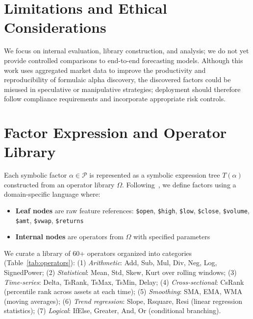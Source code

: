 \documentclass[sigconf]{acmart}
\begin{document}
\section{Limitations and Ethical Considerations}
We focus on internal evaluation, library construction, and analysis; we do not yet provide controlled comparisons to end-to-end forecasting models. Although this work uses aggregated market data to improve the productivity and reproducibility of formulaic alpha discovery, the discovered factors could be misused in speculative or manipulative strategies; deployment should therefore follow compliance requirements and incorporate appropriate risk controls.




\newpage
\appendix
\onecolumn

\section{Factor Expression and Operator Library}
\label{app:factor-details}

Each symbolic factor $\alpha \in \mathcal{P}$ is represented as a symbolic expression tree $T(\alpha)$ constructed from an operator library $\Omega$.
Following~\citet{kakushadze2016alphas}, we define factors using a domain-specific language where:
{\setlength{\leftmargini}{1.4em}%
\begin{itemize}
  \item \textbf{Leaf nodes} are raw feature references: \texttt{\$open}, \texttt{\$high}, \texttt{\$low}, \texttt{\$close}, \texttt{\$volume}, \texttt{\$amt}, \texttt{\$vwap}, \texttt{\$returns}
  \item \textbf{Internal nodes} are operators from $\Omega$ with specified parameters
\end{itemize}
}

We curate a library of 60+ operators organized into categories (Table~\ref{tab:operators}):
(1) \emph{Arithmetic}: Add, Sub, Mul, Div, Neg, Log, SignedPower;
(2) \emph{Statistical}: Mean, Std, Skew, Kurt over rolling windows;
(3) \emph{Time-series}: Delta, TsRank, TsMax, TsMin, Delay;
(4) \emph{Cross-sectional}: CsRank (percentile rank across assets at each time);
(5) \emph{Smoothing}: SMA, EMA, WMA (moving averages);
(6) \emph{Trend regression}: Slope, Rsquare, Resi (linear regression statistics);
(7) \emph{Logical}: IfElse, Greater, And, Or (conditional branching).
\end{document}

